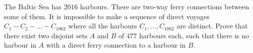The Baltic Sea has $2016$ harbours. There are two-way ferry connections between some of them. It is impossible to make a sequence of direct voyages $C_1 - C_2 - ... - C_{1062}$ where all the harbours $C_1, . . . , C_{1062}$ are distinct. Prove that there exist two disjoint sets $A$ and $B$ of $477$ harbours each, such that there is no harbour in $A$ with a direct ferry connection to a harbour in $B.$